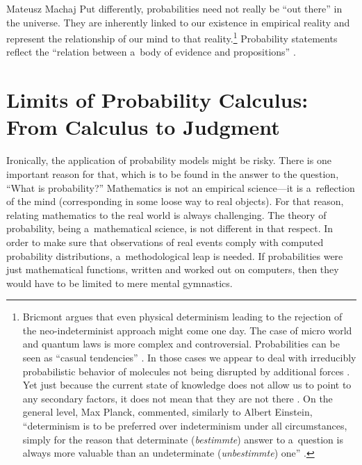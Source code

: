 \begin{artengenv}{Mateusz Machaj}
Put differently, probabilities need not really be ``out there'' in the universe. They are inherently linked to our existence in empirical reality and represent the relationship of our mind to that reality.\footnote{Bricmont 
\parencite*[][]{bricmont_determinism_2002} %
 argues that even physical determinism leading to the rejection of the neo-indeterminist approach might come one day. The case of micro world and quantum laws is more complex and controversial. Probabilities can be seen as ``casual tendencies'' 
\parencite[][p.295]{shanks_time_1993}. %
 In those cases we appear to deal with irreducibly probabilistic behavior of molecules not being disrupted by additional forces 
\parencite[][p.372]{fetzer_probability_1983}. %
 Yet just because the current state of knowledge does not allow us to point to any secondary factors, it does not mean that they are not there 
\parencite[][p.373]{fetzer_probability_1983}. %
 On the general level, Max Planck, commented, similarly to Albert Einstein, ``determinism is to be preferred over indeterminism under all circumstances, simply for the reason that determinate (\textit{bestimmte}) answer to a~question is always more valuable than an undeterminate (\textit{unbestimmte}) one'' 
\parencite[quoted in][p.281]{kruger_probability_1986}.%
} Probability statements reflect the ``relation between a~body of evidence and propositions'' 
\parencite[][p.232]{moser_foundations_1988}.%




\section{Limits of Probability Calculus: From Calculus to Judgment}

Ironically, the application of probability models might be risky. There is one important reason for that, which is to be found in the answer to the question, ``What is probability?'' Mathematics is not an empirical science---it is a~reflection of the mind (corresponding in some loose way to real objects). For that reason, relating mathematics to the real world is always challenging. The theory of probability, being a~mathematical science, is not different in that respect. In order to make sure that observations of real events comply with computed probability distributions, a~methodological leap is needed. If probabilities were just mathematical functions, written and worked out on computers, then they would have to be limited to mere mental gymnastics.




\end{artengenv}
